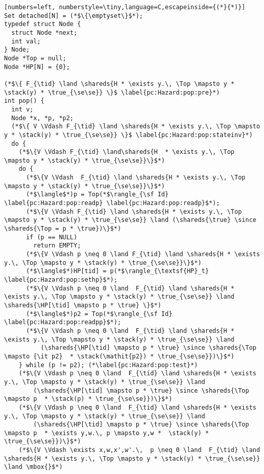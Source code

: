 \begin{figure*}
{\small
\begin{lstlisting}[numbers=left, numberstyle=\tiny,language=C,escapeinside={(*}{*)}]
Set detached[N] = (*$\{\emptyset\}$*);
typedef struct Node {
  struct Node *next;
  int val;
} Node;
Node *Top = null;
Node *HP[N] = {0};

(*$\{ F_{\tid} \land \shareds{H * \exists y.\, \Top \mapsto y * \stack(y) * \true_{\se\se}} \}$ \label{pc:Hazard:pop:pre}*) 
int pop() {
  int v;
  Node *x, *p, *p2;
  (*$\{ V \Vdash F_{\tid} \land \shareds{H * \exists y.\, \Top \mapsto y * \stack(y) * \true_{\se\se}} \}$ \label{pc:Hazard:pop:stateinv}*) 
  do {
    (*$\{V \Vdash F_{\tid} \land\shareds{H  * \exists y.\, \Top \mapsto y * \stack(y) * \true_{\se\se}}\}$*)
    do {
      (*$\{V \Vdash  F_{\tid} \land \shareds{H * \exists y.\, \Top \mapsto y * \stack(y) * \true_{\se\se}}\}$*)
      (*$\langle$*)p = Top(*$\rangle_{\sf Id}  \label{pc:Hazard:pop:readp} \label{pc:Hazard:pop:readp}$*); 
      (*$\{V \Vdash F_{\tid} \land \shareds{H * \exists y.\, \Top \mapsto y * \stack(y) * \true_{\se\se}} \land (\shareds{\true} \since \shareds{\Top = p * \true})\}$*)  
      if (p == NULL)
        return EMPTY;         
      (*$\{V \Vdash p \neq 0 \land F_{\tid} \land \shareds{H * \exists y.\, \Top \mapsto y * \stack(y) * \true_{\se\se}}\}$*)  
      (*$\langle$*)HP[tid] = p(*$\rangle_{\textsf{HP}_t} \label{pc:Hazard:pop:sethp}$*);
      (*$\{V \Vdash p \neq 0 \land  F_{\tid} \land \shareds{H * \exists y.\, \Top \mapsto y * \stack(y) * \true_{\se\se}} \land \shareds{\HP[\tid] \mapsto p * \true} \}$*) 
      (*$\langle$*)p2 = Top(*$\rangle_{\sf Id} \label{pc:Hazard:pop:readpp}$*);
      (*$\{V \Vdash p \neq 0 \land  F_{\tid} \land \shareds{H * \exists y.\, \Top \mapsto y * \stack(y) * \true_{\se\se}} \land 
          (\shareds{\HP[\tid] \mapsto p * \true} \since \shareds{\Top \mapsto {\it p2}  * \stack(\mathit{p2}) * \true_{\se\se}})\}$*)
    } while (p != p2); (*\label{pc:Hazard:pop:test}*)
    (*$\{V \Vdash p \neq 0 \land  F_{\tid} \land \shareds{H * \exists y.\, \Top \mapsto y * \stack(y) * \true_{\se\se}} \land 
        (\shareds{\HP[\tid] \mapsto p * \true} \since \shareds{\Top \mapsto p  * \stack(p) * \true_{\se\se}})\}$*)
    (*$\{V \Vdash p \neq 0 \land  F_{\tid} \land \shareds{H * \exists y.\, \Top \mapsto y * \stack(y) * \true_{\se\se}} \land 
        (\shareds{\HP[\tid] \mapsto p * \true} \since \shareds{\Top \mapsto p  * \exists y,w.\, p \mapsto y,w *  \stack(y) * \true_{\se\se}})\}$*)        
    (*$\{V \Vdash \exists x,w,x',w'.\,  p \neq 0 \land  F_{\tid} \land \shareds{H * \exists y.\, \Top \mapsto y * \stack(y) * \true_{\se\se}} \land \mbox{}$*)

\end{lstlisting}}
\end{figure*}
